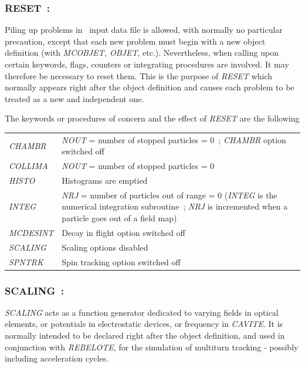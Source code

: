 \subsubsection*{RESET~: \RESETTitl}  \label{RESET} 

 Piling up problems in \zgou\ input data file is allowed, with 
normally no particular precaution, except that each new problem 
must begin with a new object definition (with \textsl{MCOBJET, OBJET}, 
etc.). Nevertheless, when calling upon certain keywords, flags, 
counters or integrating procedures are involved. 
It may therefore be necessary to reset them. This is the purpose 
of \textsl{RESET} which normally appears right after the object definition 
and causes each problem to be treated as a new and 
independent one.  
\bigskip

\noindent The keywords or procedures of concern and the effect of 
\textsl{RESET} are the following 
\bigskip

\begin{tabular}{>{\sl}l!{~:}p{13cm}}
  CHAMBR 
       & \textsl{NOUT} = number of stopped particles = 0~;  \textsl{CHAMBR} option  switched  off \\
  COLLIMA 
       & \textsl{NOUT} = number of stopped particles = 0\\
  HISTO 
       &  Histograms are emptied\\
  INTEG 
       & \textsl{NRJ} = number of particles out of range = 0 (\textsl{INTEG} is the numerical 
           integration subroutine~; \textsl{NRJ} is incremented when a particle 
            goes out of a field map)\\
   MCDESINT 
       & Decay in flight option switched off \\
  SCALING 
       &  Scaling options disabled\\
  SPNTRK 
       & Spin tracking option switched off
\end{tabular}
 \newpage

\subsubsection*{SCALING~: \SCALINGTitl} \label{SCALING}  

\textsl{SCALING} acts as a function generator dedicated to varying 
fields in optical elements, or potentials in 
electrostatic devices, or  frequency in \textsl{CAVITE}. It is normally intended
to be declared right after the object definition, and used in conjunction 
with \textsl{REBELOTE}, for the simulation of multiturn tracking - possibly including  acceleration
 cycles.  

